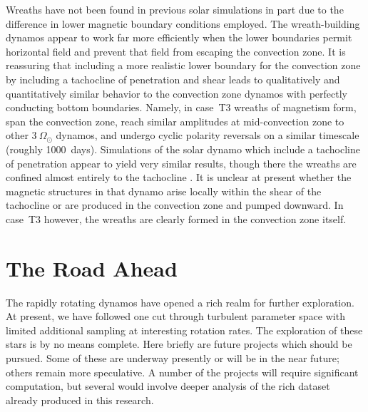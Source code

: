 Wreaths have not been found in previous solar simulations in
part due to the difference in lower magnetic boundary conditions
employed.  The wreath-building dynamos appear to work far more
efficiently when the lower boundaries permit horizontal field and
prevent that field from escaping the convection zone.  It is
reassuring that including a more realistic lower boundary for the
convection zone by including a tachocline of penetration and shear
leads to qualitatively and quantitatively similar behavior to the
convection zone dynamos with perfectly conducting bottom boundaries.
Namely, in case~T3 wreaths of magnetism form, span the convection
zone, reach similar amplitudes at mid-convection zone to other
$3\:\Omega_\odot$ dynamos, and undergo cyclic polarity reversals on a
similar timescale (roughly 1000~days).  Simulations of the solar
dynamo which include a tachocline of penetration appear to yield very
similar results, though there the wreaths are confined almost entirely
to the tachocline \citep{Browning_et_al_2006}.  It is unclear at
present whether the magnetic structures in that dynamo arise locally
within the shear of the tachocline or are produced in the convection
zone and pumped downward.  In case~T3 however, the wreaths are
clearly formed in the convection zone itself.

\clearpage
\section{The Road Ahead}
The rapidly rotating dynamos have opened a rich realm for further exploration.
At present, we have followed one cut through turbulent parameter space
with limited additional sampling at interesting rotation rates.  The exploration
of these stars is by no means complete.  Here briefly are future
projects which should be pursued.  Some of these are underway
presently or will be in the near future; others remain more
speculative.  A number of the projects will require significant
computation, but several would involve deeper analysis of the rich
dataset already produced in this research.

